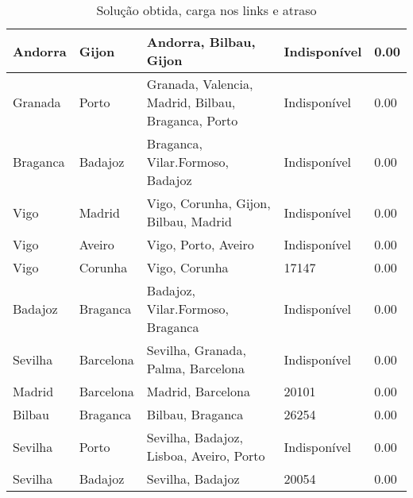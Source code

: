 \begin{table}[!htb]
{\begin{tabular}{|l|l|l|l|l|}
Andorra & Gijon & Andorra, Bilbau, Gijon & Indisponível & 0.00 \\ \hline
Granada & Porto & Granada, Valencia, Madrid, Bilbau, Braganca, Porto & Indisponível & 0.00 \\ \hline
Braganca & Badajoz & Braganca, Vilar.Formoso, Badajoz & Indisponível & 0.00 \\ \hline
Vigo & Madrid & Vigo, Corunha, Gijon, Bilbau, Madrid & Indisponível & 0.00 \\ \hline
Vigo & Aveiro & Vigo, Porto, Aveiro & Indisponível & 0.00 \\ \hline
Vigo & Corunha & Vigo, Corunha & 17147 & 0.00 \\ \hline
Badajoz & Braganca & Badajoz, Vilar.Formoso, Braganca & Indisponível & 0.00 \\ \hline
Sevilha & Barcelona & Sevilha, Granada, Palma, Barcelona & Indisponível & 0.00 \\ \hline
Madrid & Barcelona & Madrid, Barcelona & 20101 & 0.00 \\ \hline
Bilbau & Braganca & Bilbau, Braganca & 26254 & 0.00 \\ \hline
Sevilha & Porto & Sevilha, Badajoz, Lisboa, Aveiro, Porto & Indisponível & 0.00 \\ \hline
Sevilha & Badajoz & Sevilha, Badajoz & 20054 & 0.00 \\ \hline
\end{tabular}}
\caption[]{Solução obtida, carga nos links e atraso}
\end{table}

